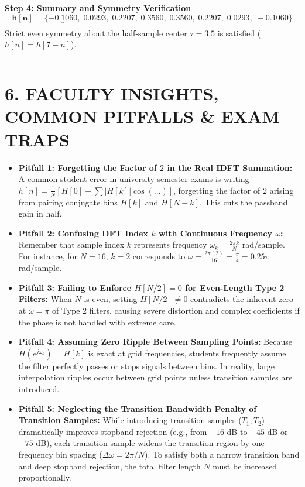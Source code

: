 \documentclass[11pt,a4paper]{article}
\begin{document}
\noindent\textbf{Step 4: Summary and Symmetry Verification}
\begin{equation}
\mathbf{h[n] = \{ \underset{\uparrow}{-0.1060}, \; 0.0293, \; 0.2207, \; 0.3560, \; 0.3560, \; 0.2207, \; 0.0293, \; -0.1060 \}}
\end{equation}
Strict even symmetry about the half-sample center $\tau = 3.5$ is satisfied ($h[n] = h[7-n]$).

\noindent\rule{\textwidth}{0.5pt}

\section{6. FACULTY INSIGHTS, COMMON PITFALLS \& EXAM TRAPS}

\begin{itemize}
    \item \textbf{Pitfall 1: Forgetting the Factor of $2$ in the Real IDFT Summation:}
    A common student error in university semester exams is writing $h[n] = \frac{1}{N}[H[0] + \sum |H[k]|\cos(\dots)]$, forgetting the factor of \textbf{$2$} arising from pairing conjugate bins $H[k]$ and $H[N-k]$. This cuts the passband gain in half.
    
    \item \textbf{Pitfall 2: Confusing DFT Index $k$ with Continuous Frequency $\omega$:}
    Remember that sample index $k$ represents frequency $\omega_k = \frac{2\pi k}{N}$ rad/sample. For instance, for $N=16$, $k=2$ corresponds to $\omega = \frac{2\pi(2)}{16} = \frac{\pi}{4} = 0.25\pi$ rad/sample.
    
    \item \textbf{Pitfall 3: Failing to Enforce $H[N/2] = 0$ for Even-Length Type 2 Filters:}
    When $N$ is even, setting $H[N/2] \ne 0$ contradicts the inherent zero at $\omega = \pi$ of Type 2 filters, causing severe distortion and complex coefficients if the phase is not handled with extreme care.
    
    \item \textbf{Pitfall 4: Assuming Zero Ripple Between Sampling Points:}
    Because $H(e^{j\omega_k}) = H[k]$ is exact at grid frequencies, students frequently assume the filter perfectly passes or stops signals between bins. In reality, large interpolation ripples occur between grid points unless transition samples are introduced.
    
    \item \textbf{Pitfall 5: Neglecting the Transition Bandwidth Penalty of Transition Samples:}
    While introducing transition samples ($T_1, T_2$) dramatically improves stopband rejection (e.g., from $-16$ dB to $-45$ dB or $-75$ dB), each transition sample widens the transition region by one frequency bin spacing ($\Delta\omega = 2\pi/N$). To satisfy both a narrow transition band and deep stopband rejection, the total filter length $N$ must be increased proportionally.
\end{itemize}
\end{document}

